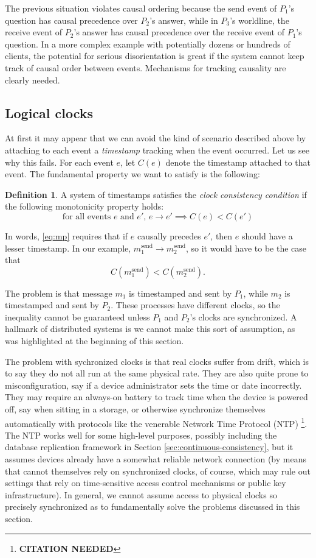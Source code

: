 \documentclass[]             %
{NASA}                       %
\theoremstyle{definition}
\newtheorem{definition}{Definition}[section]
\newcommand{\citationneeded}{\footnote{\textbf{CITATION NEEDED}}}
\begin{document}
The previous situation violates causal ordering because the send event
of $P_1$'s question has causal precedence over $P_2$'s answer, while
in $P_3$'s worldline, the receive event of $P_2$'s answer has causal
precedence over the receive event of $P_1$'s question. In a more
complex example with potentially dozens or hundreds of clients, the
potential for serious disorientation is great if the system cannot
keep track of causal order between events. Mechanisms for tracking
causality are clearly needed.

\subsection{Logical clocks}
At first it may appear that we can avoid the kind of scenario
described above by attaching to each event a \emph{timestamp} tracking
when the event occurred. Let us see why this fails. For each event
$e$, let $C(e)$ denote the timestamp attached to that event. The
fundamental property we want to satisfy is the following:

\begin{definition}
  A system of timestamps satisfies the \emph{clock consistency
  condition} if the following monotonicity property holds:
  \[ \textrm{for all events $e$ and $e'$, } e \to e' \implies C(e) < C(e') \label{eq:mp}\tag{CC} \]
\end{definition}

In words, \ref{eq:mp} requires that if $e$ causally precedes $e'$,
then $e$ should have a lesser timestamp. In our example,
$m_1^\textrm{send} \to m_2^\textrm{send}$, so it would have to be the
case that
\[C(m_1^\textrm{send}) < C(m_2^\textrm{send}).\]

The problem is that message $m_1$ is timestamped and sent by $P_1$,
while $m_2$ is timestamped and sent by $P_2$. These processes have
different clocks, so the inequality cannot be guaranteed unless $P_1$
and $P_2$'s clocks are synchronized. A hallmark of distributed
systems is we cannot make this sort of assumption, as was highlighted
at the beginning of this section.

The problem with sychronized clocks is that real clocks suffer from
drift, which is to say they do not all run at the same physical
rate. They are also quite prone to misconfiguration, say if a device
administrator sets the time or date incorrectly. They may require an
always-on battery to track time when the device is powered off, say
when sitting in a storage, or otherwise synchronize themselves
automatically with protocols like the venerable Network Time Protocol
(NTP) \citationneeded. The NTP works well for some high-level
purposes, possibly including the database replication framework in
Section \ref{sec:continuous-consistency}, but it assumes devices
already have a somewhat reliable network connection (by means that
cannot themselves rely on synchronized clocks, of course, which may
rule out settings that rely on time-sensitive access control
mechanisms or public key infrastructure). In general, we cannot assume
access to physical clocks so precisely synchronized as to
fundamentally solve the problems discussed in this section.
\end{document}
